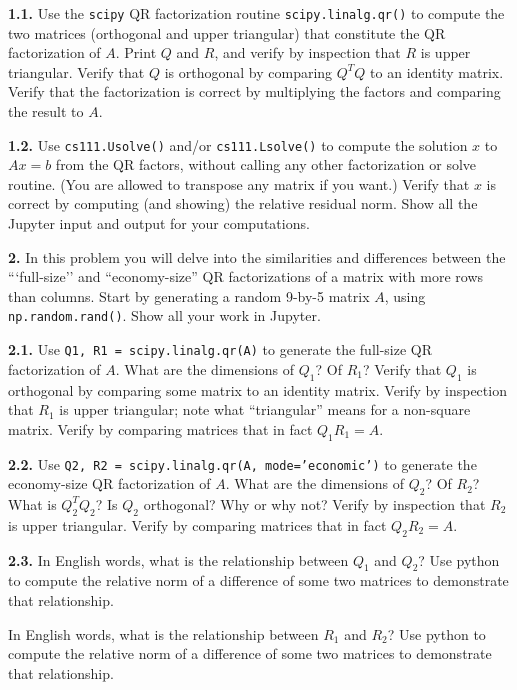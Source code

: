 \documentclass[11pt]{article}
\begin{document}
\par\medskip
{\bf 1.1.}
Use the {\tt scipy} QR factorization routine {\tt scipy.linalg.qr()}
to compute the two matrices (orthogonal and upper triangular) that
constitute the QR factorization of $A$.
Print $Q$ and $R$, and verify by inspection that $R$ is upper triangular.
Verify that $Q$ is orthogonal by comparing $Q^TQ$ to an identity matrix.
Verify that the factorization is correct by multiplying the factors and 
comparing the result to $A$.

\par\medskip
{\bf 1.2.}
Use {\tt cs111.Usolve()} and/or {\tt cs111.Lsolve()} to compute the solution $x$
to $Ax=b$ from the QR factors, without calling any other factorization or solve routine.
(You are allowed to transpose any matrix if you want.)
Verify that $x$ is correct by computing (and showing) the relative residual norm.
Show all the Jupyter input and output for your computations.

\par\bigskip
{\bf 2.}
In this problem you will delve into the similarities and differences 
between the ```full-size'' and ``economy-size'' QR factorizations of 
a matrix with more rows than columns.
Start by generating a random 9-by-5 matrix $A$, 
using {\tt np.random.rand()}.
Show all your work in Jupyter.

\par\medskip
{\bf 2.1.}
Use {\tt Q1, R1 = scipy.linalg.qr(A)} to generate the full-size QR
factorization of $A$.
What are the dimensions of $Q_1$? Of $R_1$?
Verify that $Q_1$ is orthogonal by comparing some matrix to an identity matrix.
Verify by inspection that $R_1$ is upper triangular; 
note what ``triangular'' means for a non-square matrix.
Verify by comparing matrices that in fact $Q_1R_1=A$.

\par\medskip
{\bf 2.2.}
Use {\tt Q2, R2 = scipy.linalg.qr(A, mode='economic')} 
to generate the economy-size QR factorization of $A$.
What are the dimensions of $Q_2$? Of $R_2$?
What is $Q_2^TQ_2$?  Is $Q_2$ orthogonal? Why or why not?
Verify by inspection that $R_2$ is upper triangular.
Verify by comparing matrices that in fact $Q_2R_2=A$.

\par\medskip
{\bf 2.3.}
In English words, what is the relationship between $Q_1$ and $Q_2$?  
Use python to compute the relative norm of a difference of
some two matrices to demonstrate that relationship.

In English words, what is the relationship between $R_1$ and $R_2$?  
Use python to compute the relative norm of a difference of
some two matrices to demonstrate that relationship.
\end{document}
